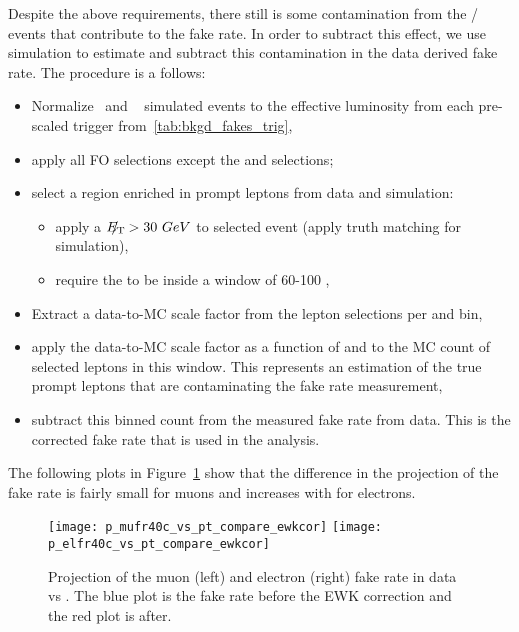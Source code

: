 Despite the above requirements, there still is some contamination from the \W/\Z
events that contribute to the fake rate. In order to subtract this effect, we
use simulation to estimate and subtract this contamination in the
data derived fake rate. The procedure is a follows:
\begin{itemize}
\item Normalize \Zgll~and \Wlnu~ simulated events to the effective luminosity from each
pre-scaled trigger from~\ref{tab:bkgd_fakes_trig},
\item apply all FO selections except the \met and \Mt selections;
\item select a region enriched in prompt leptons from data and simulation:
\begin{itemize}
\item apply a $E_{\mathrm{T}}\hspace{-1.0em}/\kern0.45em > 30\ GeV$ to selected event (apply truth matching for
simulation),
\item require the \Mt to be inside a window of 60-100 \GeV,
\end{itemize}
\item Extract a data-to-MC scale factor from the lepton selections per \pt and
\aeta bin,
\item apply the data-to-MC scale factor as a function of \pt and \aeta to the MC
count of selected leptons in this \Mt window. This represents an estimation of the
true prompt leptons that are contaminating the fake rate measurement,
\item subtract this binned count from the measured fake rate from data. This is
the corrected fake rate that is used in the analysis.
\end{itemize}

The following plots in Figure~\ref{fig:bkgd_fakes_fr_mufr_ewkcont} show that
the difference in the \pt projection of the fake rate is fairly small for muons
and increases with \pt for electrons.
\begin{figure}[tbhp]
\begin{center}
\texttt{[image: p\_mufr40c\_vs\_pt\_compare\_ewkcor]}
\texttt{[image: p\_elfr40c\_vs\_pt\_compare\_ewkcor]}
\caption[The measured fake rate vs \pt before and after the electroweak corrections]
{\label{fig:bkgd_fakes_fr_mufr_ewkcont}
Projection of the muon (left) and electron (right) fake rate in data vs \pt.
The blue plot is the fake rate before the EWK correction and the red plot is
after.
}
\end{center}
\end{figure}

